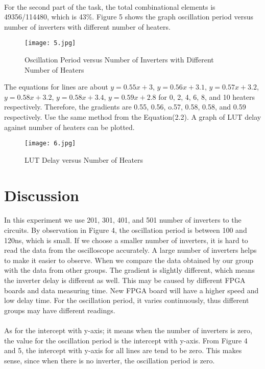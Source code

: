 \documentclass[12pt]{article}
\begin{document}
    \paragraph{}
    For the second part of the task, the total combinational elements is 49356/114480, which is 43\%. Figure 5 shows the graph oscillation period versus number of inverters with different number of heaters.
    \begin{figure}[H]
    \centering
    \texttt{[image: 5.jpg]}
    \caption{Oscillation Period versus Number of Inverters with Different Number of Heaters}
    \end{figure}
    The equations for lines are about $y=0.55x+3$, $y=0.56x+3.1$, $y=0.57x+3.2$, $y=0.58x+3.2$, $y=0.58x+3.4$, $y=0.59x+2.8$ for 0, 2, 4, 6, 8, and 10 heaters respectively. Therefore, the gradients are 0.55, 0.56, o.57, 0.58, 0.58, and 0.59 respectively. Use the same method from the Equation(2.2). A graph of LUT delay against number of heaters can be plotted.
    \begin{figure}[H]
    \centering
    \texttt{[image: 6.jpg]}
    \caption{LUT Delay versus Number of Heaters}
    \end{figure}
    
    
    \section{Discussion}
    \paragraph{}
    In this experiment we use 201, 301, 401, and 501 number of inverters to the circuits. By observation in Figure 4, the oscillation period is between 100 and 120ns, which is small. If we choose a smaller number of inverters, it is hard to read the data from the oscilloscope accurately. A large number of inverters helps to make it easier to observe. When we compare the data obtained by our group with the data from other groups. The gradient is slightly different, which means the inverter delay is different as well. This may be caused by different FPGA boards and data measuring time. New FPGA board will have a higher speed and low delay time. For the oscillation period, it varies continuously, thus different groups may have different readings.
    \paragraph{}
    As for the intercept with y-axis; it means when the number of inverters is zero, the value for the oscillation period is the intercept with y-axis. From Figure 4 and 5, the intercept with y-axis for all lines are tend to be zero. This makes sense, since when there is no inverter, the oscillation period is zero.
\end{document}
